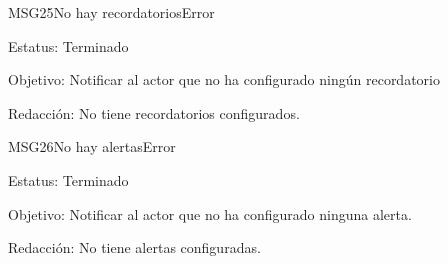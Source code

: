 \begin{mensaje}{MSG25}{No hay recordatorios}{Error}
	\item[Estatus:] Terminado
	\item[Objetivo:] Notificar al actor que no ha configurado ningún recordatorio
	\item[Redacción:] No tiene recordatorios configurados.
\end{mensaje}

\begin{mensaje}{MSG26}{No hay alertas}{Error}
	\item[Estatus:] Terminado
	\item[Objetivo:] Notificar al actor que no ha configurado ninguna alerta.
	\item[Redacción:] No tiene alertas configuradas.
\end{mensaje}
